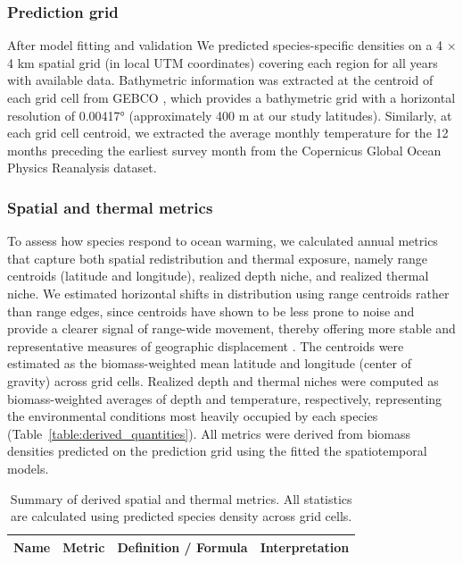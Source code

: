 \documentclass[11pt]{article}
\begin{document}
\begin{spacing}{1.5}
\subsubsection{Prediction grid}

After model fitting and validation We predicted species-specific densities on a 4 $\times$ 4 km spatial grid (in local UTM coordinates) covering each region for all years with available data. Bathymetric information was extracted at the centroid of each grid cell from GEBCO \citep{gebco_bathymetric_compilation_group_2023_gebco_2023_2023}, which provides a bathymetric grid with a horizontal resolution of 0.00417° (approximately 400 m at our study latitudes).
Similarly, at each grid cell centroid, we extracted the average monthly temperature for the 12 months preceding the earliest survey month from the Copernicus Global Ocean Physics Reanalysis dataset.

\subsubsection{Spatial and thermal metrics}\label{sec:Spatial and thermal metrics}

To assess how species respond to ocean warming, we calculated annual metrics that capture both spatial redistribution and thermal exposure, namely range centroids (latitude and longitude), realized depth niche, and realized thermal niche. 
We estimated horizontal shifts in distribution using range centroids rather than range edges, since centroids have shown to be less prone to noise and provide a clearer signal of range-wide movement, thereby offering more stable and representative measures of geographic displacement \citep{shoo_detecting_2006}.
The centroids were estimated as the biomass-weighted mean latitude and longitude (center of gravity) across grid cells. Realized depth and thermal niches were computed as biomass-weighted averages of depth and temperature, respectively, representing the environmental conditions most heavily occupied by each species (Table~\ref{table:derived_quantities}). All metrics were derived from biomass densities predicted on the prediction grid using the fitted the spatiotemporal models. 

\begin{table}[h!]
\caption{Summary of derived spatial and thermal metrics. All statistics are calculated using predicted species density across grid cells.}
\centering
\renewcommand{\arraystretch}{1.5}
\begin{tabular}{
    >{\raggedright\arraybackslash}p{3.2cm} 
    >{\raggedright\arraybackslash}p{3.5cm} 
    >{\raggedright\arraybackslash}p{5cm} 
    >{\raggedright\arraybackslash}p{4.3cm}
}
\toprule
\textbf{Name} & \textbf{Metric} & \textbf{Definition / Formula} & \textbf{Interpretation} \\
\midrule


\end{tabular}
\end{table}
\end{spacing}
\end{document}
